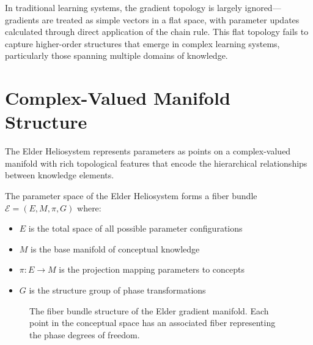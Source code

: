 In traditional learning systems, the gradient topology is largely ignored—gradients are treated as simple vectors in a flat space, with parameter updates calculated through direct application of the chain rule. This flat topology fails to capture higher-order structures that emerge in complex learning systems, particularly those spanning multiple domains of knowledge.

\section{Complex-Valued Manifold Structure}

The Elder Heliosystem represents parameters as points on a complex-valued manifold with rich topological features that encode the hierarchical relationships between knowledge elements.

\begin{theorem}
The parameter space of the Elder Heliosystem forms a fiber bundle $\mathcal{E} = (E, M, \pi, G)$ where:
\begin{itemize}
    \item $E$ is the total space of all possible parameter configurations
    \item $M$ is the base manifold of conceptual knowledge
    \item $\pi: E \rightarrow M$ is the projection mapping parameters to concepts
    \item $G$ is the structure group of phase transformations
\end{itemize}
\end{theorem}

\begin{figure}[ht]
\centering
{}
\caption{The fiber bundle structure of the Elder gradient manifold. Each point in the conceptual space has an associated fiber representing the phase degrees of freedom.}
\label{fig:fiber_bundle}
\end{figure}

